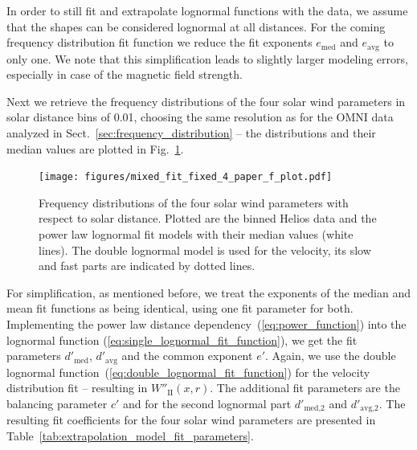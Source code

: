 In order to still fit and extrapolate lognormal functions with the data, we assume that the shapes can be considered lognormal at all distances. For the coming frequency distribution fit function we reduce the fit exponents $e_\text{med}$ and $e_\text{avg}$ to only one. We note that this simplification leads to slightly larger modeling errors, especially in case of the magnetic field strength.

Next we retrieve the frequency distributions of the four solar wind parameters in solar distance bins of \SI{0.01}{\au}, choosing the same resolution as for the OMNI data analyzed in Sect.~\ref{sec:frequency_distribution} -- the distributions and their median values are plotted in Fig.~\ref{fig:mixed_fit_fixed_4_paper_f_plot}.
\begin{figure}
	\texttt{[image: figures/mixed\_fit\_fixed\_4\_paper\_f\_plot.pdf]}
	\caption{Frequency distributions of the four solar wind parameters with respect to solar distance. Plotted are the binned Helios data and the power law lognormal fit models with their median values (white lines). The double lognormal model is used for the velocity, its slow and fast parts are indicated by dotted lines.}
	\label{fig:mixed_fit_fixed_4_paper_f_plot}
\end{figure}
For simplification, as mentioned before, we treat the exponents of the median and mean fit functions as being identical, using one fit parameter for both. Implementing the power law distance dependency~(\ref{eq:power_function}) into the lognormal function (\ref{eq:single_lognormal_fit_function}), we get the fit parameters $d'_\text{med}$, $d'_\text{avg}$ and the common exponent $e'$. Again, we use the double lognormal function~(\ref{eq:double_lognormal_fit_function}) for the velocity distribution fit -- resulting in $W''_\text{II}(x,r)$. The additional fit parameters are the balancing parameter $c'$ and for the second lognormal part $d'_\text{med,2}$ and $d'_\text{avg,2}$. The resulting fit coefficients for the four solar wind parameters are presented in Table~\ref{tab:extrapolation_model_fit_parameters}.
